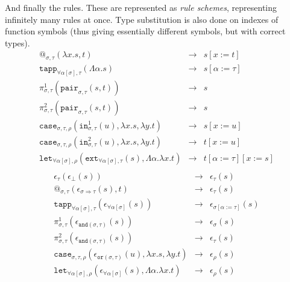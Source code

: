 \documentclass[runningheads,a4paper]{llncs}
\newcommand{\quant}[2]{\forall #1[#2]}
\newcommand{\qquant}[3]{#1 #2[#3]}
\newcommand{\arrtype}{\Rightarrow}
\newcommand{\abs}[2]{\lambda #1.#2}
\newcommand{\tabs}[2]{\Lambda #1.#2}
\begin{document}
And finally the rules.  These are represented as \emph{rule schemes},
representing infinitely many rules at once.  Type substitution is also
done on indexes of function symbols (thus giving essentially
different symbols, but with correct types).
\[
\begin{array}{rcl}
@_{\sigma,\tau}(\abs{x}{s},t) & \to & s[x:=t] \\
\mathtt{tapp}_{\quant{\alpha}{\sigma},\tau}(\tabs{\alpha}{s}) & \to &
  s[\alpha:=\tau] \\
\pi^1_{\sigma,\tau}(\mathtt{pair}_{\sigma,\tau}(s,t)) & \to & s \\
\pi^2_{\sigma,\tau}(\mathtt{pair}_{\sigma,\tau}(s,t)) & \to & s \\
\mathtt{case}_{\sigma,\tau,\rho}(\mathtt{in}^1_{\sigma,\tau}(u),
  \abs{x}{s},\abs{y}{t}) & \to & s[x:=u] \\
\mathtt{case}_{\sigma,\tau,\rho}(\mathtt{in}^2_{\sigma,\tau}(u),
  \abs{x}{s},\abs{y}{t}) & \to & t[x:=u] \\
\mathtt{let}_{\qquant{\forall}{\alpha}{\sigma},\rho}(
  \mathtt{ext}_{\qquant{\forall}{\alpha}{\sigma},\tau}(s),\tabs{\alpha}{
    \abs{x}{t}}) & \to & t[\alpha:=\tau][x:=s] \\
\end{array}
\]
\[
\begin{array}{rcl}
\epsilon_\tau(\epsilon_\bot(s)) & \to & \epsilon_\tau(s) \\
@_{\sigma,\tau}(\epsilon_{\sigma \arrtype \tau}(s),t) & \to &
  \epsilon_\tau(s) \\
\mathtt{tapp}_{\quant{\alpha}{\sigma},\tau}(
  \epsilon_{\quant{\alpha}{\sigma}}(s)) & \to &
  \epsilon_{\sigma[\alpha:=\tau]}(s) \\
\pi^1_{\sigma,\tau}(\epsilon_{\mathtt{and}(\sigma,\tau)}(s)) & \to &
  \epsilon_\sigma(s) \\
\pi^2_{\sigma,\tau}(\epsilon_{\mathtt{and}(\sigma,\tau)}(s)) & \to &
  \epsilon_\tau(s) \\
\mathtt{case}_{\sigma,\tau,\rho}(\epsilon_{\mathtt{or}(\sigma,\tau)}(
  u),\abs{x}{s},\abs{y}{t}) & \to & \epsilon_\rho(s) \\
\mathtt{let}_{\qquant{\forall}{\alpha}{\sigma},\rho}(\epsilon_{\qquant{
  \forall}{\alpha}{\sigma}}(s),\tabs{\alpha}{\abs{x}{t}}) & \to &
  \epsilon_\rho(s) \\
\end{array}
\]
\end{document}
